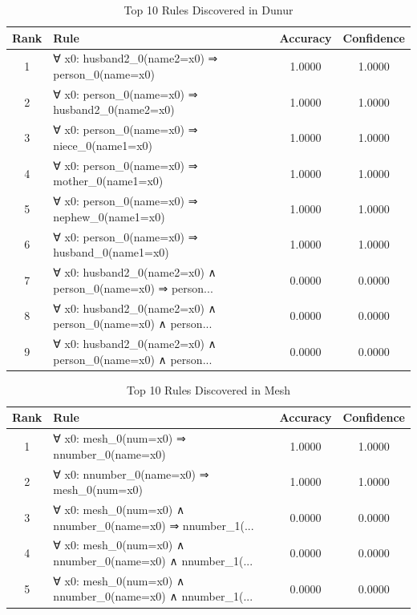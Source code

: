 \documentclass[11pt,a4paper]{article}
\begin{document}
\begin{table}[h!]
\centering
\small
\caption{Top 10 Rules Discovered in Dunur}
\label{tab:rules_Dunur}
\begin{tabular}{|c|p{5cm}|c|c|}
\hline
\textbf{Rank} & \textbf{Rule} & \textbf{Accuracy} & \textbf{Confidence} \\
\hline
1 & ∀ x0: husband2\_0(name2=x0) ⇒ person\_0(name=x0) & 1.0000 & 1.0000 \\
2 & ∀ x0: person\_0(name=x0) ⇒ husband2\_0(name2=x0) & 1.0000 & 1.0000 \\
3 & ∀ x0: person\_0(name=x0) ⇒ niece\_0(name1=x0) & 1.0000 & 1.0000 \\
4 & ∀ x0: person\_0(name=x0) ⇒ mother\_0(name1=x0) & 1.0000 & 1.0000 \\
5 & ∀ x0: person\_0(name=x0) ⇒ nephew\_0(name1=x0) & 1.0000 & 1.0000 \\
6 & ∀ x0: person\_0(name=x0) ⇒ husband\_0(name1=x0) & 1.0000 & 1.0000 \\
7 & ∀ x0: husband2\_0(name2=x0) ∧ person\_0(name=x0) ⇒ person... & 0.0000 & 0.0000 \\
8 & ∀ x0: husband2\_0(name2=x0) ∧ person\_0(name=x0) ∧ person... & 0.0000 & 0.0000 \\
9 & ∀ x0: husband2\_0(name2=x0) ∧ person\_0(name=x0) ∧ person... & 0.0000 & 0.0000 \\
\hline
\end{tabular}
\end{table}

\begin{table}[h!]
\centering
\small
\caption{Top 10 Rules Discovered in Mesh}
\label{tab:rules_Mesh}
\begin{tabular}{|c|p{5cm}|c|c|}
\hline
\textbf{Rank} & \textbf{Rule} & \textbf{Accuracy} & \textbf{Confidence} \\
\hline
1 & ∀ x0: mesh\_0(num=x0) ⇒ nnumber\_0(name=x0) & 1.0000 & 1.0000 \\
2 & ∀ x0: nnumber\_0(name=x0) ⇒ mesh\_0(num=x0) & 1.0000 & 1.0000 \\
3 & ∀ x0: mesh\_0(num=x0) ∧ nnumber\_0(name=x0) ⇒ nnumber\_1(... & 0.0000 & 0.0000 \\
4 & ∀ x0: mesh\_0(num=x0) ∧ nnumber\_0(name=x0) ∧ nnumber\_1(... & 0.0000 & 0.0000 \\
5 & ∀ x0: mesh\_0(num=x0) ∧ nnumber\_0(name=x0) ∧ nnumber\_1(... & 0.0000 & 0.0000 \\
\hline
\end{tabular}
\end{table}
\end{document}
